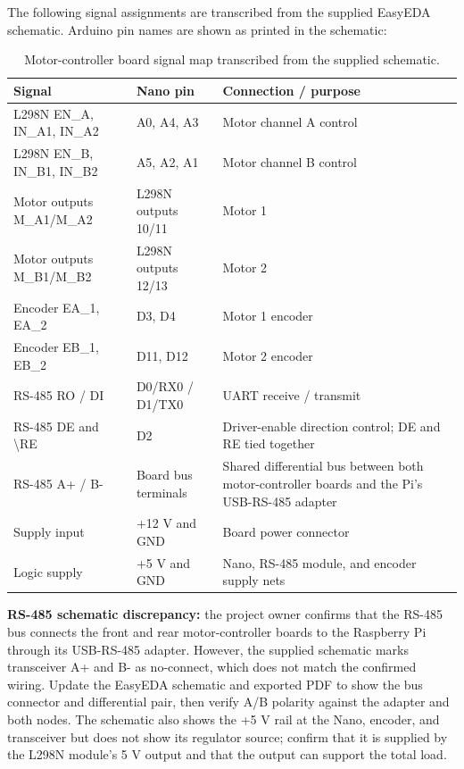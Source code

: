 The following signal assignments are transcribed from the supplied EasyEDA schematic. Arduino pin names are shown as printed in the schematic:
\begin{table}[!htbp]
    \centering
    \small
    \begin{tabular}{p{4.0cm}p{3.5cm}p{6.0cm}}
        \toprule
        \textbf{Signal} & \textbf{Nano pin} & \textbf{Connection / purpose} \\
        \midrule
        L298N EN\_A, IN\_A1, IN\_A2 & A0, A4, A3 & Motor channel A control \\
        L298N EN\_B, IN\_B1, IN\_B2 & A5, A2, A1 & Motor channel B control \\
        Motor outputs M\_A1/M\_A2 & L298N outputs 10/11 & Motor 1 \\
        Motor outputs M\_B1/M\_B2 & L298N outputs 12/13 & Motor 2 \\
        Encoder EA\_1, EA\_2 & D3, D4 & Motor 1 encoder \\
        Encoder EB\_1, EB\_2 & D11, D12 & Motor 2 encoder \\
        RS-485 RO / DI & D0/RX0 / D1/TX0 & UART receive / transmit \\
        RS-485 DE and \textbackslash RE & D2 & Driver-enable direction control; DE and RE tied together \\
        RS-485 A+ / B- & Board bus terminals & Shared differential bus between both motor-controller boards and the Pi's USB-RS-485 adapter \\
        Supply input & +12 V and GND & Board power connector \\
        Logic supply & +5 V and GND & Nano, RS-485 module, and encoder supply nets \\
        \bottomrule
    \end{tabular}
    \caption{Motor-controller board signal map transcribed from the supplied schematic.}
    \label{tab:motor_controller_pins}
\end{table}

\textbf{RS-485 schematic discrepancy:} the project owner confirms that the RS-485 bus connects the front and rear motor-controller boards to the Raspberry Pi through its USB-RS-485 adapter. However, the supplied schematic marks transceiver A+ and B- as no-connect, which does not match the confirmed wiring. Update the EasyEDA schematic and exported PDF to show the bus connector and differential pair, then verify A/B polarity against the adapter and both nodes. The schematic also shows the +5 V rail at the Nano, encoder, and transceiver but does not show its regulator source; confirm that it is supplied by the L298N module's 5 V output and that the output can support the total load.

